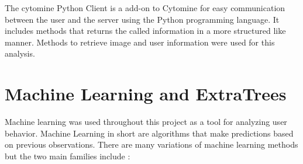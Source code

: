 \documentclass[a4paper,11pt]{report}
\numberwithin{figure}{section} %
\begin{document}
    The cytomine Python Client is a add-on to Cytomine for easy communication between the user and the server using the Python programming language.
    It includes methods that returns the called information in a more structured like manner.
    Methods to retrieve image and user information were used for this analysis.

    \section{Machine Learning and ExtraTrees}

    Machine learning was used throughout this project as a tool for analyzing user behavior.
    Machine Learning in short are algorithms that make predictions based on previous observations.
    There are many variations of machine learning methods but the two main families include :
\end{document}
